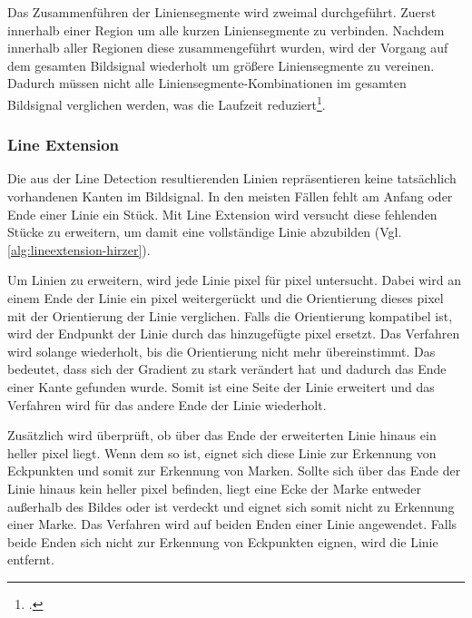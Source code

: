 Das Zusammenführen der Liniensegmente wird zweimal durchgeführt. Zuerst innerhalb einer Region um alle kurzen
 Liniensegmente zu verbinden. Nachdem innerhalb aller Regionen diese zusammengeführt wurden, wird der Vorgang auf dem
 gesamten Bildsignal wiederholt um größere Liniensegmente zu vereinen. Dadurch müssen nicht alle
 Liniensegmente-Kombinationen im gesamten Bildsignal verglichen werden, was die Laufzeit
 reduziert\footcite[Vgl.][S.~10]{hirzer08}.


\subsubsection{Line Extension} %
\label{sub:line_extension}



Die aus der Line Detection resultierenden Linien repräsentieren keine tatsächlich vorhandenen Kanten im Bildsignal. In
 den meisten Fällen fehlt am Anfang oder Ende einer Linie ein Stück. Mit Line Extension wird versucht diese fehlenden
 Stücke zu erweitern, um damit eine vollständige Linie abzubilden (Vgl. \autoref{alg:lineextension-hirzer}).

Um Linien zu erweitern, wird jede Linie \gls{pixel} für \gls{pixel} untersucht. Dabei wird an einem Ende der Linie
 ein \gls{pixel} weitergerückt und die Orientierung dieses \gls{pixel} mit der Orientierung der Linie verglichen. Falls
 die Orientierung kompatibel ist, wird der Endpunkt der Linie durch das hinzugefügte \gls{pixel} ersetzt. Das Verfahren
 wird solange wiederholt, bis die Orientierung nicht mehr übereinstimmt. Das bedeutet, dass sich der Gradient zu stark
 verändert hat und dadurch das Ende einer Kante gefunden wurde. Somit ist eine Seite der Linie erweitert und das
 Verfahren wird für das andere Ende der Linie wiederholt.

Zusätzlich wird überprüft, ob über das Ende der erweiterten Linie hinaus ein heller \gls{pixel} liegt. Wenn dem so ist,
 eignet sich diese Linie zur Erkennung von Eckpunkten und somit zur Erkennung von Marken. Sollte sich über das Ende der
 Linie hinaus kein heller \gls{pixel} befinden, liegt eine Ecke der Marke entweder außerhalb des Bildes oder ist
 verdeckt und eignet sich somit nicht zu Erkennung einer Marke. Das Verfahren wird auf beiden Enden einer Linie
 angewendet. Falls beide Enden sich nicht zur Erkennung von Eckpunkten eignen, wird die Linie entfernt.

